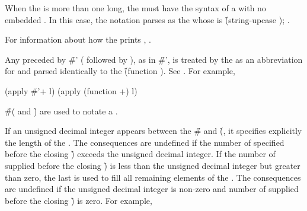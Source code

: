 When the   is more than one  long,
the  must have the syntax of a  
with no embedded .
In this case, the   notation
parses as the  whose  is \f{(string-upcase )};
\seesection\CharacterNames.


For information about how the  prints  ,
\seesection\PrintingCharacters.

\endsubsubsection%




Any  preceded by \f{\#'} 
( followed by ),
as in \f{\#'},
is treated by the  as an abbreviation for and parsed identically 
to the  \f{(function )}.
See .  For example,

\code
(apply #'+ l) \EQ (apply (function +) l)
\endcode

\endsubsubsection%
                   


\f{\#(} and \f{)} are used to notate a . 

If an unsigned decimal integer
appears between the \f{\#} and \f{(},
it specifies explicitly the length of the .  
The consequences are undefined if the number of  
specified before the closing \f{)}
exceeds the unsigned decimal integer.
If the number of  supplied before the closing \f{)}
is less than the unsigned decimal integer but greater than zero,
the last 
is used to fill all
remaining elements of the .
The consequences are undefined if the unsigned decimal integer is non-zero and
number of  supplied before the closing \f{)}
is zero.
For example,

